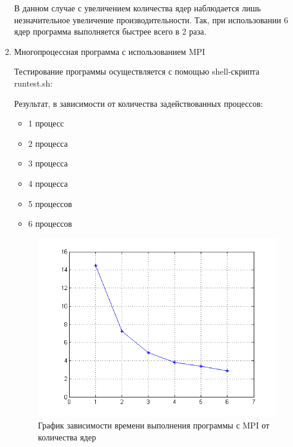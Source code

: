 \begin{enumerate}
В данном случае с увеличением количества ядер наблюдается лишь незначительное увеличение производительности. Так, при использовании 6 ядер программа выполняется быстрее всего в 2 раза.

\item Многопроцессная программа с использованием MPI

Тестирование программы осуществляется с помощью shell-скрипта runtest.sh:



Результат, в зависимости от количества задействованных процессов:

\begin{itemize}
	\item 1 процесс
		
	\item 2 процесса
		
	\item 3 процесса
		
	\item 4 процесса
		
	\item 5 процессов
		
	\item 6 процессов
		
\end{itemize}

\begin{figure}[H]
	\begin{center}
		\includegraphics[scale=0.7]{pic/mpi.png}
		\caption{График зависимости времени выполнения программы с MPI от количества ядер} 
		\label{pic:pic_name} %
	\end{center}
\end{figure}


\end{enumerate}
